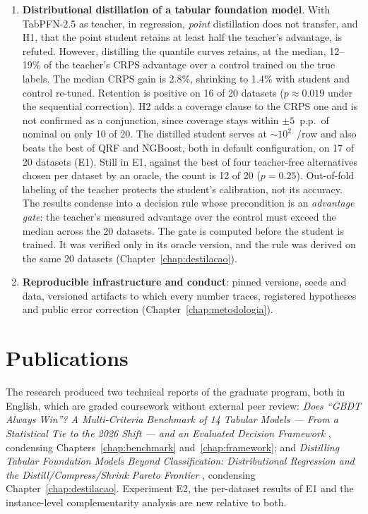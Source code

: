 \begin{enumerate}
    generation, a median the executable always-TabFM policy also
    attains. Experiment E2 locates the inversion of that
    recommendation at 10--20\% of the weight on latency, by median regret under rank normalization (0.1 grid), and at 20--35\% under the alternative normalizations (finer grid). The flowchart is the synthesis of
    these studies, not an evaluated policy
    (Chapter~\ref{chap:framework}).
  \item \textbf{Distributional distillation of a tabular foundation
    model}. With TabPFN-2.5 as teacher, in regression, \emph{point}
    distillation does not transfer, and H1, that the point
    student retains at least half the teacher's advantage, is
    refuted. However, distilling the quantile curves retains, at the median, 12--19\% of the teacher's CRPS advantage over a control trained on the true labels. The median CRPS gain is 2.8\%, shrinking to 1.4\% with student and control re-tuned. Retention is positive on 16 of 20 datasets
    ($p\approx0.019$ under the sequential correction). H2 adds a coverage clause to the CRPS one and is not confirmed as a conjunction, since coverage stays within $\pm5$~p.p.\ of nominal on only 10 of 20. The distilled student serves at ${\sim}10^2$~\us/row and also beats
    the best of QRF and NGBoost, both in
    default configuration, on 17 of 20 datasets (E1). Still in E1, against the best of four teacher-free alternatives chosen per dataset by an oracle, the count is 12 of 20 ($p=0.25$). Out-of-fold labeling of the teacher protects
    the student's calibration, not its accuracy. The results condense
    into a decision rule whose precondition is an \emph{advantage
    gate}: the teacher's measured advantage over the control must
    exceed the median across the 20 datasets. The gate is computed
    before the student is trained. It was verified only in its oracle version, and the rule was derived on the same
    20 datasets (Chapter~\ref{chap:destilacao}).
  \item \textbf{Reproducible infrastructure and conduct}: pinned versions, seeds and data, versioned artifacts to
    which every number traces, registered hypotheses and public error
    correction (Chapter~\ref{chap:metodologia}).
\end{enumerate}

\section{Publications}
\label{sec:intro-producao}

The research produced two technical reports of the graduate program,
both in English, which are graded coursework without external peer
review: \emph{Does ``GBDT Always Win''? A Multi-Criteria Benchmark of 14
Tabular Models --- From a Statistical Tie to the 2026 Shift --- and
an Evaluated Decision Framework} \citep{companion2026}, condensing
Chapters~\ref{chap:benchmark} and~\ref{chap:framework}; and
\emph{Distilling Tabular Foundation Models Beyond Classification:
Distributional Regression and the Distill/Compress/Shrink Pareto
Frontier} \citep{companion-ai2-2026}, condensing
Chapter~\ref{chap:destilacao}. Experiment E2, the per-dataset results
of E1 and the instance-level complementarity analysis are new
relative to both.

